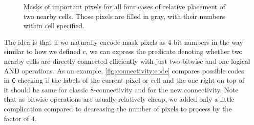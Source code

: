 \documentclass{llncs}
\renewcommand{\C}{\texttt{C} \xspace}
\begin{document}
\begin{figure}
  \centering
  \begin{subfigure}[t]{0.2\linewidth}
    \centering
  \end{subfigure}
  \begin{subfigure}[t]{0.2\linewidth}
    \centering
  \end{subfigure}
  \begin{subfigure}[t]{0.2\linewidth}
    \centering
  \end{subfigure}
  \begin{subfigure}[t]{0.25\linewidth}
    \centering
  \end{subfigure}
  \caption{Masks of important pixels for all four cases of relative placement
  of two nearby cells. Those pixels are filled in gray, with their numbers within
  cell specified.}
  \label{fig:connectivity:masks}
\end{figure}

The idea is that if we naturally encode mask pixels as 4-bit numbers in the
way similar to how we defined $c$, we can express the predicate denoting whether
two nearby cells
are directly connected efficiently with just two bitwise and one logical AND
operations.
As an example, \autoref{fig:connectivity:code} compares possible codes in \C checking
if the labels of the current pixel or cell and the one right on top of it
should be same for classic 8-connectivity and for the new connectivity.
Note that as bitwise operations are usually relatively cheap, we added only a
little complication compared to decreasing the number of pixels to process by the 
factor of 4.
\end{document}

